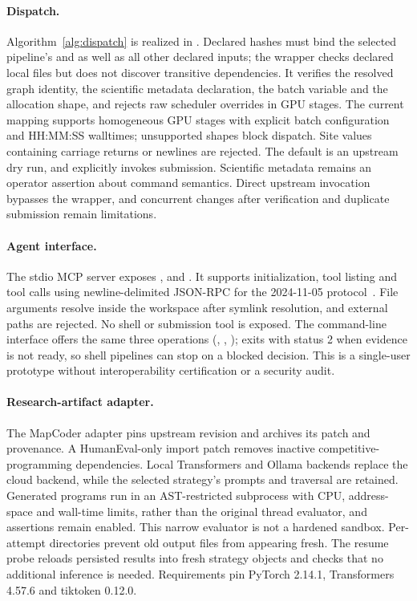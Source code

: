 \paragraph{Dispatch.} Algorithm~\ref{alg:dispatch} is realized in . Declared hashes must bind the selected pipeline's  and  as well as all other declared inputs; the wrapper checks declared local files but does not discover transitive dependencies. It verifies the resolved graph identity, the scientific metadata declaration, the batch variable and the allocation shape, and rejects raw scheduler overrides in GPU stages. The current mapping supports homogeneous GPU stages with explicit batch configuration and HH:MM:SS walltimes; unsupported shapes block dispatch. Site values containing carriage returns or newlines are rejected. The default is an upstream dry run, and  explicitly invokes submission. Scientific metadata remains an operator assertion about command semantics. Direct upstream invocation bypasses the wrapper, and concurrent changes after verification and duplicate submission remain limitations.

\paragraph{Agent interface.} The stdio MCP server exposes ,  and . It supports initialization, tool listing and tool calls using newline-delimited JSON-RPC for the 2024-11-05 protocol~\cite{mcp2024transport}. File arguments resolve inside the workspace after symlink resolution, and external paths are rejected. No shell or submission tool is exposed. The command-line interface offers the same three operations (, , );  exits with status 2 when evidence is not ready, so shell pipelines can stop on a blocked decision. This is a single-user prototype without interoperability certification or a security audit.

\paragraph{Research-artifact adapter.} The MapCoder adapter pins upstream revision  and archives its patch and provenance. A HumanEval-only import patch removes inactive competitive-programming dependencies. Local Transformers and Ollama backends replace the cloud backend, while the selected strategy's prompts and traversal are retained. Generated programs run in an AST-restricted subprocess with CPU, address-space and wall-time limits, rather than the original thread evaluator, and assertions remain enabled. This narrow evaluator is not a hardened sandbox. Per-attempt directories prevent old output files from appearing fresh. The resume probe reloads persisted results into fresh strategy objects and checks that no additional inference is needed. Requirements pin PyTorch 2.14.1, Transformers 4.57.6 and tiktoken 0.12.0.

